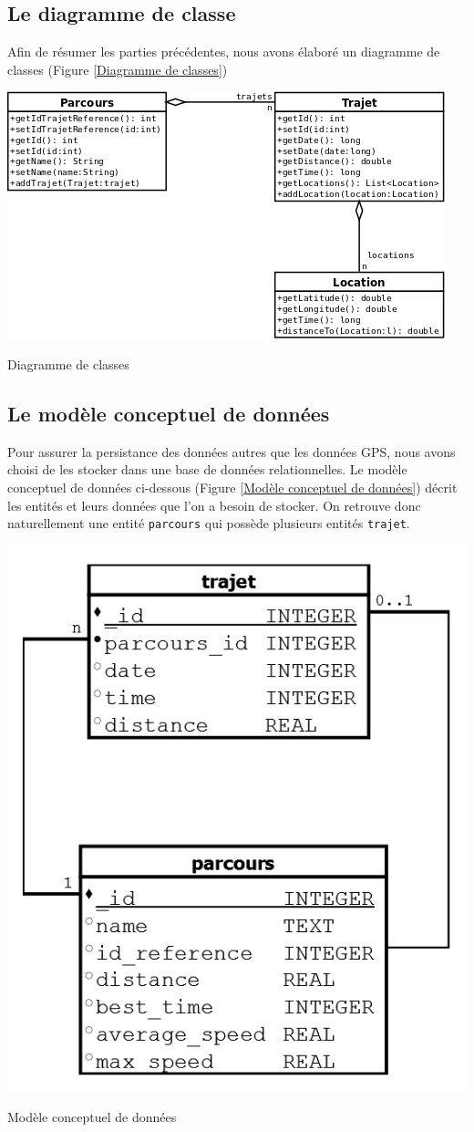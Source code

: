 \subsection{Le diagramme de classe}
Afin de résumer les parties précédentes, nous avons élaboré un diagramme de classes (Figure \ref{Diagramme de classes})
\begin{img}
  \includegraphics[scale=0.6]{img/DiagrammeDeClasse.png}
  \caption{Diagramme de classes}
  \label{Diagramme de classes}
\end{img}

\subsection{Le modèle conceptuel de données}
Pour assurer la persistance des données autres que les données GPS, nous avons choisi de les stocker dans une base de données relationnelles. Le modèle conceptuel de données ci-dessous (Figure \ref{Modèle conceptuel de données}) décrit les entités et leurs données que l'on a besoin de stocker. On retrouve donc naturellement une entité \verb!parcours! qui possède plusieurs entités \verb!trajet!. 

\begin{img}
  \includegraphics[scale=0.3]{img/bdd.png}
  \caption{Modèle conceptuel de données}
  \label{Modèle conceptuel de données}
\end{img}
